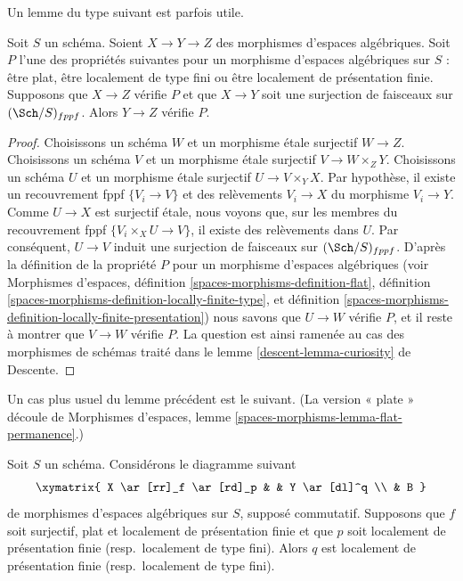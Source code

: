\noindent
Un lemme du type suivant est parfois utile.

\begin{lemma}
\label{lemma-curiosity}
Soit $S$ un schéma. Soient $X \to Y \to Z$ des morphismes d'espaces algébriques.
Soit $P$ l'une des propriétés suivantes pour un morphisme d'espaces algébriques
sur $S$ :
être plat, être localement de type fini ou être localement de présentation finie.
Supposons que $X \to Z$ vérifie $P$ et que
$X \to Y$ soit une surjection de faisceaux sur $(\Sch/S)_{fppf}$.
Alors $Y \to Z$ vérifie $P$.
\end{lemma}

\begin{proof}
Choisissons un schéma $W$ et un morphisme \'etale surjectif $W \to Z$.
Choisissons un schéma $V$ et un morphisme \'etale surjectif $V \to W \times_Z Y$.
Choisissons un schéma $U$ et un morphisme \'etale surjectif $U \to V \times_Y X$.
Par hypothèse, il existe un recouvrement fppf $\{V_i \to V\}$ et des
relèvements $V_i \to X$ du morphisme $V_i \to Y$. Comme $U \to X$ est surjectif
\'etale, nous voyons que, sur les membres du recouvrement fppf
$\{V_i \times_X U \to V\}$, il existe des relèvements dans $U$. Par conséquent, $U \to V$ induit
une surjection de faisceaux sur $(\Sch/S)_{fppf}$.
D'après la définition de la propriété $P$ pour un
morphisme d'espaces algébriques (voir
Morphismes d'espaces,
définition \ref{spaces-morphisms-definition-flat},
définition \ref{spaces-morphisms-definition-locally-finite-type}, et
définition \ref{spaces-morphisms-definition-locally-finite-presentation})
nous savons que $U \to W$ vérifie $P$, et il reste à montrer que $V \to W$ vérifie $P$.
La question est ainsi ramenée au cas des morphismes de schémas
traité dans le
lemme \ref{descent-lemma-curiosity} de Descente.
\end{proof}

\noindent
Un cas plus usuel du lemme précédent est le suivant.
(La version « plate » découle de
Morphismes d'espaces, lemme \ref{spaces-morphisms-lemma-flat-permanence}.)

\begin{lemma}
\label{lemma-flat-finitely-presented-permanence}
Soit $S$ un schéma. Considérons le diagramme suivant
$$
\xymatrix{
X \ar[rr]_f \ar[rd]_p & &
Y \ar[dl]^q \\
& B
}
$$
de morphismes d'espaces algébriques sur $S$, supposé commutatif.
Supposons que $f$ soit surjectif, plat et localement de présentation finie
et que $p$ soit localement de présentation finie (resp.\ localement
de type fini). Alors $q$ est localement de présentation finie
(resp.\ localement de type fini).
\end{lemma}

